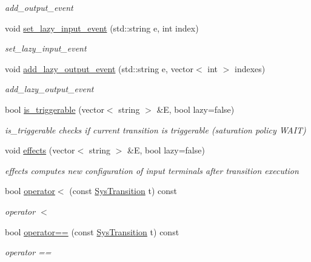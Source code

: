 \begin{DoxyCompactItemize}
\begin{DoxyCompactList}\small\item\em add\+\_\+output\+\_\+event \end{DoxyCompactList}\item 
void \hyperlink{class_sys_transition_a1a467d06dfa861340820815247fa0bab}{set\+\_\+lazy\+\_\+input\+\_\+event} (std\+::string e, int index)
\begin{DoxyCompactList}\small\item\em set\+\_\+lazy\+\_\+input\+\_\+event \end{DoxyCompactList}\item 
void \hyperlink{class_sys_transition_ac97ba8c514e4925a7b86dacf31a69a7d}{add\+\_\+lazy\+\_\+output\+\_\+event} (std\+::string e, vector$<$ int $>$ indexes)
\begin{DoxyCompactList}\small\item\em add\+\_\+lazy\+\_\+output\+\_\+event \end{DoxyCompactList}\item 
bool \hyperlink{class_sys_transition_aa46d54c147f5a7c1aa1442d7612953f4}{is\+\_\+triggerable} (vector$<$ string $>$ \&E, bool lazy=false)
\begin{DoxyCompactList}\small\item\em is\+\_\+triggerable checks if current transition is triggerable (saturation policy W\+A\+IT) \end{DoxyCompactList}\item 
void \hyperlink{class_sys_transition_aca76296b036d975c4df4e22169b20028}{effects} (vector$<$ string $>$ \&E, bool lazy=false)
\begin{DoxyCompactList}\small\item\em effects computes new configuration of input terminals after transition execution \end{DoxyCompactList}\item 
bool \hyperlink{class_sys_transition_a91b3fe79173a73dbe6698c5b31f952e3}{operator$<$} (const \hyperlink{class_sys_transition}{Sys\+Transition} t) const 
\begin{DoxyCompactList}\small\item\em operator $<$ \end{DoxyCompactList}\item 
bool \hyperlink{class_sys_transition_a7f7fc86a8a9aa93bc2c46ce4b9bdbc7d}{operator==} (const \hyperlink{class_sys_transition}{Sys\+Transition} t) const 
\begin{DoxyCompactList}\small\item\em operator == \end{DoxyCompactList}\end{DoxyCompactItemize}
